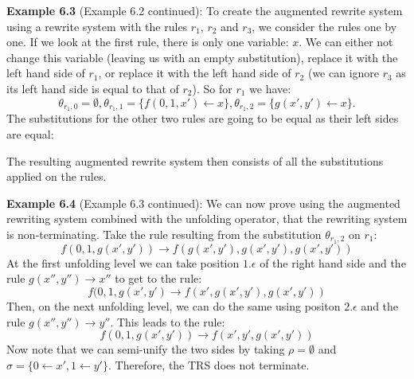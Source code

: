\textbf{Example 6.3} (Example 6.2 continued): To create the augmented rewrite system using a rewrite system with the rules $r_1$, $r_2$ and $r_3$, we consider the rules one by one. If we look at the first rule, there is only one variable: $x$. We can either not change this variable (leaving us with an empty substitution), replace it with the left hand side of $r_1$, or replace it with the left hand side of $r_2$ (we can ignore $r_3$ as its left hand side is equal to that of $r_2$). So for $r_1$ we have:
$$ \theta_{r_1,0} = \emptyset, \theta_{r_1,1} = \{ f(0, 1, x') \leftarrow x \}, \theta_{r_1,2} = \{ g(x', y') \leftarrow x \}\text{.}$$
The substitutions for the other two rules are going to be equal as their left sides are equal:
\begin{center}
\end{center}
The resulting augmented rewrite system then consists of all the substitutions applied on the rules.

\textbf{Example 6.4} (Example 6.3 continued): We can now prove using the augmented rewriting system combined with the unfolding operator, that the rewriting system is non-terminating. Take the rule resulting from the substitution $\theta_{r_1, 2}$ on $r_1$: 
$$f(0, 1, g(x', y')) \rightarrow f(g(x', y'), g(x', y'), g(x', y'))$$
At the first unfolding level we can take position $1.\epsilon$ of the right hand side and the rule $g(x'', y'') \rightarrow x''$ to get to the rule:
$$f(0, 1, g(x', y') \rightarrow f(x', g(x', y'), g(x', y'))$$ 
Then, on the next unfolding level, we can do the same using positon $2.\epsilon$ and the rule $g(x'', y'') \rightarrow y''$. This leads to the rule:
$$f(0, 1, g(x', y')) \rightarrow f(x', y', g(x', y'))$$
Now note that we can semi-unify the two sides by taking $\rho = \emptyset$ and $\sigma = \{ 0 \leftarrow x', 1 \leftarrow y' \}$. Therefore, the TRS does not terminate.

